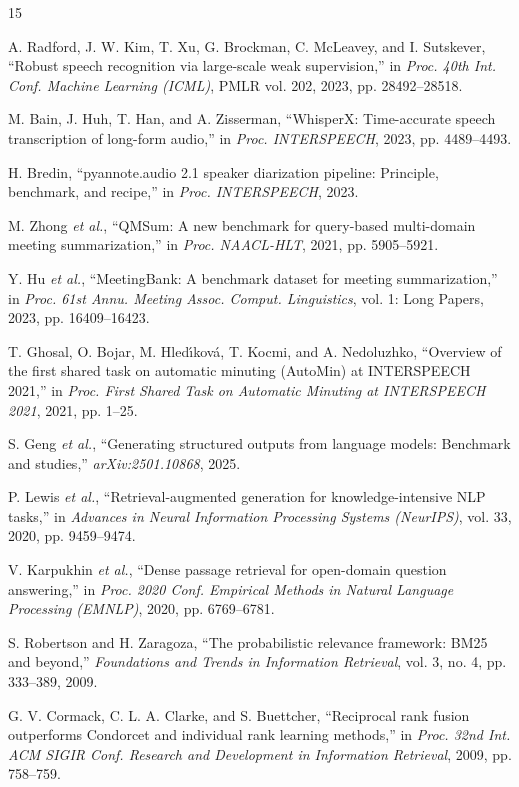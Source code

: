 \documentclass[conference]{IEEEtran}
\begin{document}
\begin{thebibliography}{15}

 A. Radford, J. W. Kim, T. Xu, G. Brockman, C. McLeavey, and I. Sutskever, ``Robust speech recognition via large-scale weak supervision,'' in \emph{Proc. 40th Int. Conf. Machine Learning (ICML)}, PMLR vol. 202, 2023, pp. 28492--28518.

 M. Bain, J. Huh, T. Han, and A. Zisserman, ``WhisperX: Time-accurate speech transcription of long-form audio,'' in \emph{Proc. INTERSPEECH}, 2023, pp. 4489--4493.

 H. Bredin, ``pyannote.audio 2.1 speaker diarization pipeline: Principle, benchmark, and recipe,'' in \emph{Proc. INTERSPEECH}, 2023.

 M. Zhong \emph{et al.}, ``QMSum: A new benchmark for query-based multi-domain meeting summarization,'' in \emph{Proc. NAACL-HLT}, 2021, pp. 5905--5921.

 Y. Hu \emph{et al.}, ``MeetingBank: A benchmark dataset for meeting summarization,'' in \emph{Proc. 61st Annu. Meeting Assoc. Comput. Linguistics}, vol. 1: Long Papers, 2023, pp. 16409--16423.

 T. Ghosal, O. Bojar, M. Hled\'{\i}kov\'{a}, T. Kocmi, and A. Nedoluzhko, ``Overview of the first shared task on automatic minuting (AutoMin) at INTERSPEECH 2021,'' in \emph{Proc. First Shared Task on Automatic Minuting at INTERSPEECH 2021}, 2021, pp. 1--25.

 S. Geng \emph{et al.}, ``Generating structured outputs from language models: Benchmark and studies,'' \emph{arXiv:2501.10868}, 2025.

 P. Lewis \emph{et al.}, ``Retrieval-augmented generation for knowledge-intensive NLP tasks,'' in \emph{Advances in Neural Information Processing Systems (NeurIPS)}, vol. 33, 2020, pp. 9459--9474.

 V. Karpukhin \emph{et al.}, ``Dense passage retrieval for open-domain question answering,'' in \emph{Proc. 2020 Conf. Empirical Methods in Natural Language Processing (EMNLP)}, 2020, pp. 6769--6781.

 S. Robertson and H. Zaragoza, ``The probabilistic relevance framework: BM25 and beyond,'' \emph{Foundations and Trends in Information Retrieval}, vol. 3, no. 4, pp. 333--389, 2009.

 G. V. Cormack, C. L. A. Clarke, and S. Buettcher, ``Reciprocal rank fusion outperforms Condorcet and individual rank learning methods,'' in \emph{Proc. 32nd Int. ACM SIGIR Conf. Research and Development in Information Retrieval}, 2009, pp. 758--759.


\end{thebibliography}
\end{document}
